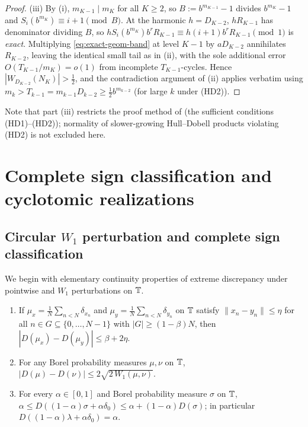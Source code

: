 \documentclass[11pt]{article}
\newcommand{\dist}[1]{\lVert #1\rVert}
\begin{document}
\begin{proof}
(iii) By (i), $m_{K-1}\mid m_K$ for all $K\ge2$, so $B:=b^{m_{K-1}}-1$ divides $b^{m_K}-1$ and $S_i(b^{m_K})\equiv i+1\pmod B$. At the harmonic $h=D_{K-2}$, $hR_{K-1}$ has denominator dividing $B$, so $hS_i(b^{m_K})b^rR_{K-1}\equiv h(i+1)b^rR_{K-1}\pmod1$ is \emph{exact}. Multiplying \eqref{eq:exact-geom-band} at level $K-1$ by $aD_{K-2}$ annihilates $R_{K-2}$, leaving the identical small tail as in (ii), with the sole additional error $O(T_{K-1}/m_K)=o(1)$ from incomplete $T_{K-1}$-cycles. Hence $|W_{D_{K-2}}(N_K)|>\frac12$, and the contradiction argument of (ii) applies verbatim using $m_k>T_{k-1}=m_{k-1}D_{k-2}\ge\frac12 b^{m_{k-2}}$ (for large $k$ under \textup{(HD2)}).
\end{proof}

Note that part (iii) restricts the proof method of  (the sufficient conditions \textup{(HD1)}--\textup{(HD2)}); normality of slower-growing Hull--Dobell products violating \textup{(HD2)} is not excluded here.

\section{Complete sign classification and cyclotomic realizations}\label{sec:signs}

\subsection{Circular $W_1$ perturbation and complete sign classification}

We begin with elementary continuity properties of extreme discrepancy under pointwise and $W_1$ perturbations on $\mathbb T$.

\begin{lemma}\label{lem:W1-cont}
\begin{enumerate}[label=\textup{(\roman*)},nosep]
\item If $\mu_x=\frac1N\sum_{n<N}\delta_{x_n}$ and $\mu_y=\frac1N\sum_{n<N}\delta_{y_n}$ on $\mathbb T$ satisfy $\dist{x_n-y_n}\le\eta$ for all $n\in G\subseteq\{0,\dots,N-1\}$ with $|G|\ge(1-\beta)N$, then $|D(\mu_x)-D(\mu_y)|\le\beta+2\eta$.
\item For any Borel probability measures $\mu,\nu$ on $\mathbb T$, $|D(\mu)-D(\nu)|\le 2\sqrt{2\,W_1(\mu,\nu)}$.
\item For every $\alpha\in[0,1]$ and Borel probability measure $\sigma$ on $\mathbb T$, $\alpha\le D((1-\alpha)\sigma+\alpha\delta_0)\le\alpha+(1-\alpha)D(\sigma)$; in particular $D((1-\alpha)\lambda+\alpha\delta_0)=\alpha$.
\end{enumerate}
\end{lemma}
\end{document}
